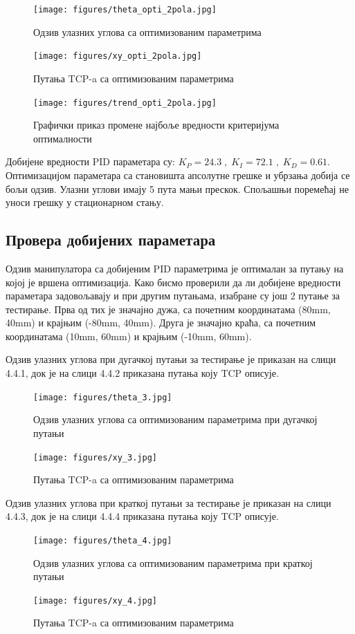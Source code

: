 \documentclass[12pt]{article}
\begin{document}
\begin{figure}[H]
    \centering
    \texttt{[image: figures/theta\_opti\_2pola.jpg]}
    \caption{Одзив улазних углова са оптимизованим параметрима}
    \label{fig:theta2}
\end{figure}
\begin{figure}[H]
    \centering
    \texttt{[image: figures/xy\_opti\_2pola.jpg]}
    \caption{Путања TCP-a са оптимизованим параметрима}
    \label{fig:xy2}
\end{figure}
\begin{figure}[H]
    \centering
    \texttt{[image: figures/trend\_opti\_2pola.jpg]}
    \caption{Графички приказ промене најбоље вредности критеријума оптималности}
    \label{fig:trend_2}
\end{figure}
Добијене вредности PID параметара су: $K_P=24.3\;,\;K_I=72.1\;,\;K_D=0.61$. Оптимизацијом параметара са становишта апсолутне грешке и убрзања добија се бољи одзив. Улазни углови имају 5 пута мањи прескок. Спољашњи поремећај не уноси грешку у стационарном стању.

\subsection{Провера добијених параметара}
Одзив манипулатора са добијеним PID параметрима је оптималан за путању на којој је вршена оптимизација.
Како бисмо проверили да ли добијене вредности параметара задовољавају и при другим путањама, изабране су још 2 путање за тестирање. Прва од тих је значајно дужа, са почетним координатама (80mm, 40mm) и крајњим (-80mm, 40mm). Друга је значајно краћа, са почетним координатама (10mm, 60mm) и крајњим (-10mm, 60mm).

Одзив улазних углова при дугачкој путањи за тестирање је приказан на слици 4.4.1, док је на слици 4.4.2 приказана путања коју TCP описује.
\begin{figure}[H]
    \centering
    \texttt{[image: figures/theta\_3.jpg]}
    \caption{Одзив улазних углова са оптимизованим параметрима при дугачкој путањи}
    \label{fig:theta3}
\end{figure}
\begin{figure}[H]
    \centering
    \texttt{[image: figures/xy\_3.jpg]}
    \caption{Путања TCP-a са оптимизованим параметрима}
    \label{fig:xy_3}
\end{figure}
Одзив улазних углова при краткој путањи за тестирање је приказан на слици 4.4.3, док је на слици 4.4.4 приказана путања коју TCP описује.
\begin{figure}[H]
    \centering
    \texttt{[image: figures/theta\_4.jpg]}
    \caption{Одзив улазних углова са оптимизованим параметрима при краткој путањи}
    \label{fig:theta_short}
\end{figure}
\begin{figure}[H]
    \centering
    \texttt{[image: figures/xy\_4.jpg]}
    \caption{Путања TCP-a са оптимизованим параметрима}
    \label{fig:xy_short}
\end{figure}
\end{document}
